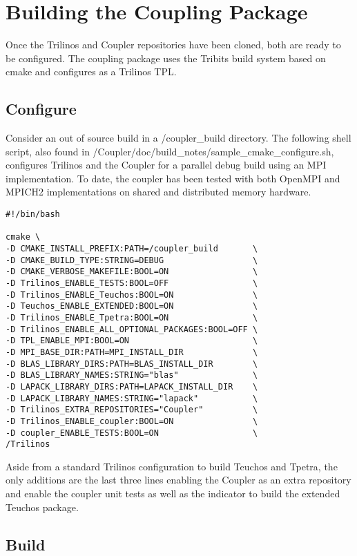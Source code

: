 \documentclass[letterpaper]{article}
\begin{document}
\section{Building the Coupling Package}
Once the Trilinos and Coupler repositories have been cloned, both are
ready to be configured. The coupling package uses the Tribits build
system based on cmake and configures as a Trilinos TPL.

\subsection{Configure}
Consider an out of source build in a /coupler\_build directory. The
following shell script, also found in
/Coupler/doc/build\_notes/sample\_cmake\_configure.sh, configures
Trilinos and the Coupler for a parallel debug build using an MPI
implementation. To date, the coupler has been tested with both OpenMPI
and MPICH2 implementations on shared and distributed memory hardware.

\begin{verbatim}
#!/bin/bash

cmake \
-D CMAKE_INSTALL_PREFIX:PATH=/coupler_build       \
-D CMAKE_BUILD_TYPE:STRING=DEBUG                  \
-D CMAKE_VERBOSE_MAKEFILE:BOOL=ON                 \
-D Trilinos_ENABLE_TESTS:BOOL=OFF                 \
-D Trilinos_ENABLE_Teuchos:BOOL=ON                \
-D Teuchos_ENABLE_EXTENDED:BOOL=ON                \
-D Trilinos_ENABLE_Tpetra:BOOL=ON                 \
-D Trilinos_ENABLE_ALL_OPTIONAL_PACKAGES:BOOL=OFF \
-D TPL_ENABLE_MPI:BOOL=ON                         \
-D MPI_BASE_DIR:PATH=MPI_INSTALL_DIR              \
-D BLAS_LIBRARY_DIRS:PATH=BLAS_INSTALL_DIR        \
-D BLAS_LIBRARY_NAMES:STRING="blas"               \
-D LAPACK_LIBRARY_DIRS:PATH=LAPACK_INSTALL_DIR    \
-D LAPACK_LIBRARY_NAMES:STRING="lapack"           \
-D Trilinos_EXTRA_REPOSITORIES="Coupler"          \
-D Trilinos_ENABLE_coupler:BOOL=ON                \
-D coupler_ENABLE_TESTS:BOOL=ON                   \
/Trilinos
\end{verbatim}

Aside from a standard Trilinos configuration to build Teuchos and
Tpetra, the only additions are the last three lines enabling the
Coupler as an extra repository and enable the coupler unit tests as
well as the indicator to build the extended Teuchos package.

\subsection{Build}
\end{document}
